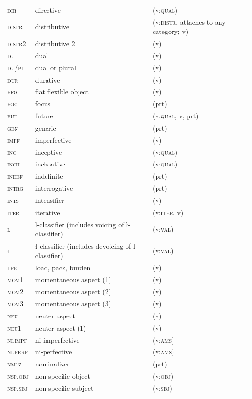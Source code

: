 \begin{xltabular}{\textwidth}{lXX}
\textsc{dir} & directive & (v:\textsc{qual})\\
\textsc{distr} & distributive & (v:\textsc{distr}, attaches to any category; v)\\
\textsc{distr2} & distributive 2 & (v)\\
\textsc{du} & dual & (v)\\
\textsc{du}/\textsc{pl} & dual or plural & (v)\\
\textsc{dur} & durative & (v)\\
\textsc{ffo} & flat flexible object & (v)\\
\textsc{foc} & focus & (prt)\\
\textsc{fut} & future & (v:\textsc{qual}, v, prt)\\
\textsc{gen} & generic & (prt)\\
\textsc{impf} & imperfective & (v)\\
\textsc{inc} & inceptive & (v:\textsc{qual})\\
\textsc{inch} & inchoative & (v:\textsc{qual})\\\textsc{indef} & indefinite & (prt)\\
\textsc{intrg} & interrogative & (prt)\\
\textsc{ints} & intensifier & (v)\\
\textsc{iter} & iterative & (v:\textsc{iter}, v)\\
\textsc{l} & l-classifier (includes voicing of ł-classifier) & (v:\textsc{val})\\
\textsc{ł} & ł-classifier (includes devoicing of l-classifier) & (v:\textsc{val})\\
\textsc{lpb} & load, pack, burden & (v)\\
\textsc{mom}1 & momentaneous aspect (1) & (v)\\
\textsc{mom}2 & momentaneous aspect (2) & (v)\\
\textsc{mom}3 & momentaneous aspect (3) & (v)\\
\textsc{neu} & neuter aspect & (v)\\
\textsc{neu}1 & neuter aspect (1) & (v)\\
\textsc{ni}.\textsc{impf} & ni-imperfective & (v:\textsc{ams})\\
\textsc{ni}.\textsc{perf} & ni-perfective & (v:\textsc{ams})\\
\textsc{nmlz} & nominalizer & (prt)\\
\textsc{nsp}.\textsc{obj} & non-specific object & (v:\textsc{obj})\\
\textsc{nsp}.\textsc{sbj} & non-specific subject & (v:\textsc{sbj})\\

\end{xltabular}
